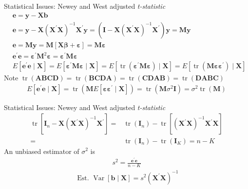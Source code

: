 \documentclass{beamer}
\begin{document}
\begin{frame}{Statistical Issues: Newey and West adjusted \textit{t-statistic}}
	\begin{align*}
		&\mathbf{e}=\mathbf{y}-\mathbf{X} \mathbf{b}\\
		&\mathbf{e}=\mathbf{y}-\mathbf{X}\left(\mathbf{X}^{\prime} \mathbf{X}\right)^{-1} \mathbf{X}^{\prime} \mathbf{y}=\left(\mathbf{I}-\mathbf{X}\left(\mathbf{X}^{\prime} \mathbf{X}\right)^{-1} \mathbf{X}^{\prime}\right) \mathbf{y}=\mathbf{M} \mathbf{y}\\
		&\mathbf{e}=\mathbf{M} \mathbf{y}=\mathbf{M}[\mathbf{X} \boldsymbol{\beta}+\boldsymbol{\varepsilon}]=\mathbf{M} \boldsymbol{\varepsilon}\\
		&\mathbf{e}^{\prime} \mathbf{e}=\boldsymbol{\varepsilon}^{\prime} \mathbf{M}^2 \boldsymbol{\varepsilon}=\boldsymbol{\varepsilon}^{\prime} \mathbf{M} \boldsymbol{\varepsilon}\\
		&E\left[\mathbf{e}^{\prime} \mathbf{e} \mid \mathbf{X}\right]=E\left[\boldsymbol{\varepsilon}^{\prime} \mathbf{M} \boldsymbol{\varepsilon} \mid \mathbf{X}\right]=E\left[\operatorname{tr}\left(\boldsymbol{\varepsilon}^{\prime} \mathbf{M} \boldsymbol{\varepsilon}\right) \mid \mathbf{X}\right]=E\left[\operatorname{tr}\left(\mathbf{M} \boldsymbol{\varepsilon} \boldsymbol{\varepsilon}^{\prime}\right) \mid \mathbf{X}\right]
	\end{align*}
Note $ \operatorname{tr}(\mathbf{A} \mathbf{B C D})=\operatorname{tr}(\mathbf{B C D} \mathbf{A})=\operatorname{tr}(\mathbf{C D} \mathbf{A} \mathbf{B})=\operatorname{tr}(\mathbf{D} \mathbf{A} \mathbf{B C}) $
\begin{align*}
	E\left[\mathbf{e}^{\prime} \mathbf{e} \mid \mathbf{X}\right] = \operatorname{tr}\left(\mathbf{M} E\left[\boldsymbol{\varepsilon} \boldsymbol{\varepsilon}^{\prime} \mid \mathbf{X}\right]\right)=\operatorname{tr}\left(\mathbf{M} \sigma^{2} \mathbf{I}\right)=\sigma^{2} \operatorname{tr}(\mathbf{M})
\end{align*}

\end{frame}

\begin{frame}{Statistical Issues: Newey and West adjusted \textit{t-statistic}}
	\begin{align*}
		\operatorname{tr}\left[\mathbf{I}_{n}-\mathbf{X}\left(\mathbf{X}^{\prime} \mathbf{X}\right)^{-1} \mathbf{X}^{\prime}\right]=&\operatorname{tr}\left(\mathbf{I}_{n}\right)-\operatorname{tr}\left[\left(\mathbf{X}^{\prime} \mathbf{X}\right)^{-1} \mathbf{X}^{\prime} \mathbf{X}\right]\\
		=&\operatorname{tr}\left(\mathbf{I}_{n}\right)-\operatorname{tr}\left(\mathbf{I}_{K}\right)=n-K
	\end{align*}
	An unbiased estimator of $ \sigma^2 $ is
	\begin{align*}
		s^{2}=\frac{\mathbf{e}^{\prime} \mathbf{e}}{n-K}
	\end{align*}
\begin{align*}
	\text { Est. } \operatorname{Var}[\mathbf{b} \mid \mathbf{X}]=s^{2}\left(\mathbf{X}^{\prime} \mathbf{X}\right)^{-1}
\end{align*}
\end{frame}
\end{document}
